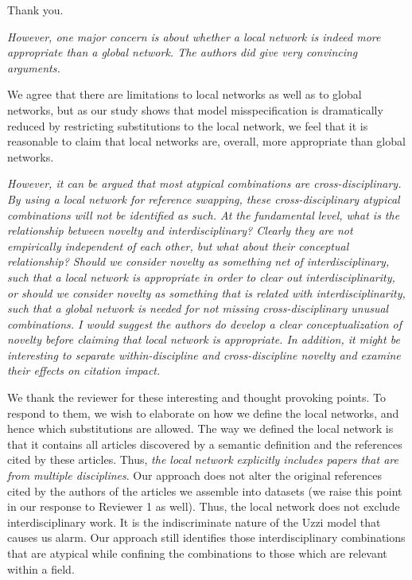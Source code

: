 \documentclass[11pt, oneside]{article}   	%
\begin{document}
Thank you. 
 
\emph{However, one major concern is about whether a local network is indeed more appropriate than a global network.  The authors did give very convincing arguments. }

We agree that there are limitations to local networks as well as to global networks, but as our study shows that model misspecification is dramatically reduced by restricting substitutions to the local network, we feel that it is reasonable to claim that local networks are, overall, more appropriate
than global networks.

\emph{However, it can be argued that most atypical combinations are cross-disciplinary.  By using a local network for reference swapping, these cross-disciplinary atypical combinations will not be identified as such.  At the fundamental level, what is the relationship between novelty and interdisciplinary?  Clearly they are not empirically independent of each other, but what about their conceptual relationship?  Should we consider novelty as something net of interdisciplinary, such that a local network is appropriate in order to clear out interdisciplinarity, or should we consider novelty as something that is related with interdisciplinarity, such that a global network is needed for not missing cross-disciplinary unusual combinations.  I would suggest the authors do develop a clear conceptualization of novelty before claiming that local network is appropriate.  In addition, it might be interesting to separate within-discipline and cross-discipline novelty and examine their effects on citation impact.}

We thank the reviewer for these interesting and thought provoking points. To respond to them, we  wish to elaborate on how we define the local networks, and hence which substitutions are allowed. The way we defined the local network is that it contains all articles discovered by a semantic definition and the references cited by these articles. Thus, \emph{the local network explicitly includes papers that are from multiple disciplines}. Our approach does not alter the original references cited by the authors of the articles we assemble into datasets (we raise this point in our response to Reviewer 1 as well). Thus, the local network does not exclude interdisciplinary work. It is the indiscriminate nature of the Uzzi model that causes us alarm.  Our approach still identifies those interdisciplinary combinations that are atypical while confining the combinations to those which are relevant within a field.  
\end{document}
